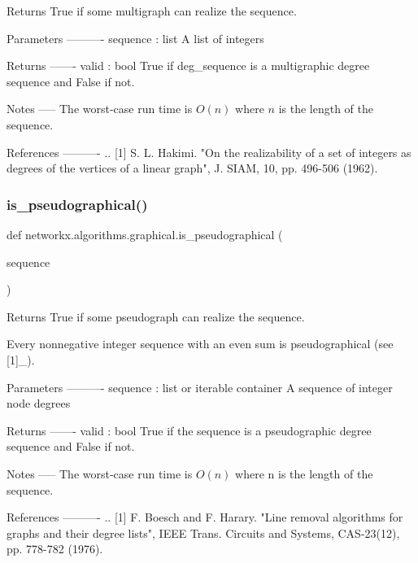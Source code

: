 \begin{DoxyVerb}Returns True if some multigraph can realize the sequence.

Parameters
----------
sequence : list
    A list of integers

Returns
-------
valid : bool
    True if deg_sequence is a multigraphic degree sequence and False if not.

Notes
-----
The worst-case run time is $O(n)$ where $n$ is the length of the sequence.

References
----------
.. [1] S. L. Hakimi. "On the realizability of a set of integers as
   degrees of the vertices of a linear graph", J. SIAM, 10, pp. 496-506
   (1962).
\end{DoxyVerb}
 \mbox{\label{namespacenetworkx_1_1algorithms_1_1graphical_ac9f720f881776738444ef4dcbab3cf2e}} 
\subsubsection{\texorpdfstring{is\+\_\+pseudographical()}{is\_pseudographical()}}
{\footnotesize\ttfamily def networkx.\+algorithms.\+graphical.\+is\+\_\+pseudographical (\begin{DoxyParamCaption}\item[{}]{sequence }\end{DoxyParamCaption})}

\begin{DoxyVerb}Returns True if some pseudograph can realize the sequence.

Every nonnegative integer sequence with an even sum is pseudographical
(see [1]_).

Parameters
----------
sequence : list or iterable container
    A sequence of integer node degrees

Returns
-------
valid : bool
  True if the sequence is a pseudographic degree sequence and False if not.

Notes
-----
The worst-case run time is $O(n)$ where n is the length of the sequence.

References
----------
.. [1] F. Boesch and F. Harary. "Line removal algorithms for graphs
   and their degree lists", IEEE Trans. Circuits and Systems, CAS-23(12),
   pp. 778-782 (1976).
\end{DoxyVerb}
 \mbox{\label{namespacenetworkx_1_1algorithms_1_1graphical_a27f77443e8204c7a57ea1fd41b56b86f}} 
